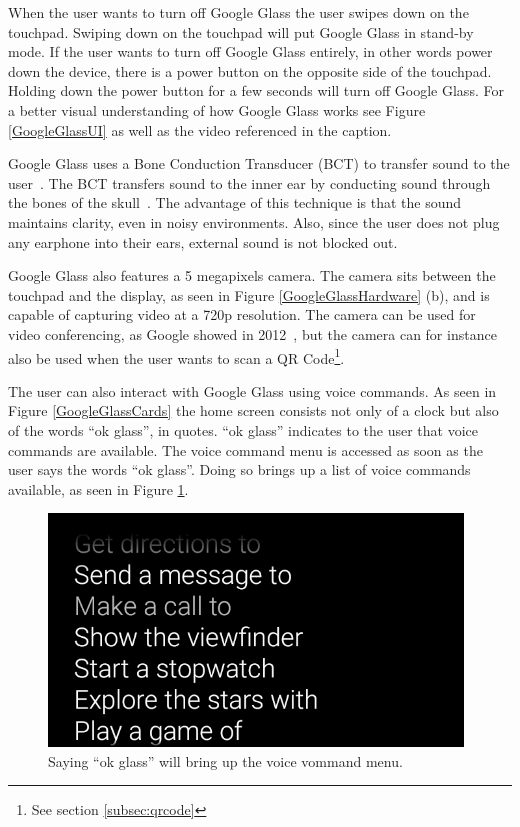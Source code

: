 When the user wants to turn off Google Glass the user swipes down on the touchpad. Swiping down on the touchpad will put Google Glass in stand-by mode. If the user wants to turn off Google Glass entirely, in other words power down the device, there is a power button on the opposite side of the touchpad. Holding down the power button for a few seconds will turn off Google Glass. For a better visual understanding of how Google Glass works see Figure \ref{GoogleGlassUI} as well as the video referenced in the caption.

Google Glass uses a Bone Conduction Transducer (BCT) to transfer sound to the user~\cite{GlassSpecs}. The BCT transfers sound to the inner ear by conducting sound through the bones of the skull~\cite{boneConductionWiki}. The advantage of this technique is that the sound maintains clarity, even in noisy environments. Also, since the user does not plug any earphone into their ears, external sound is not blocked out.

Google Glass also features a 5 megapixels camera. The camera sits between the touchpad and the display, as seen in Figure \ref{GoogleGlassHardware} (b), and is capable of capturing video at a 720p resolution. The camera can be used for video conferencing, as Google showed in 2012~\cite{glassLiveDemo}, but the camera can for instance also be used when the user wants to scan a QR Code\footnote{See section \ref{subsec:qrcode}}.

The user can also interact with Google Glass using voice commands. As seen in Figure \ref{GoogleGlassCards} the home screen consists not only of a clock but also of the words ``ok glass'', in quotes. ``ok glass'' indicates to the user that voice commands are available. The voice command menu is accessed as soon as the user says the words ``ok glass''. Doing so brings up a list of voice commands available, as seen in Figure \ref{voiceCommandMenu}.

	\begin{figure}[ht!]
		\centering
		\includegraphics[width=110mm]{images/glassVoiceMenu}
		\caption{Saying ``ok glass'' will bring up the voice vommand menu. \cite{googleGlassVoiceCommand}}
		\label{voiceCommandMenu}
	\end{figure}

